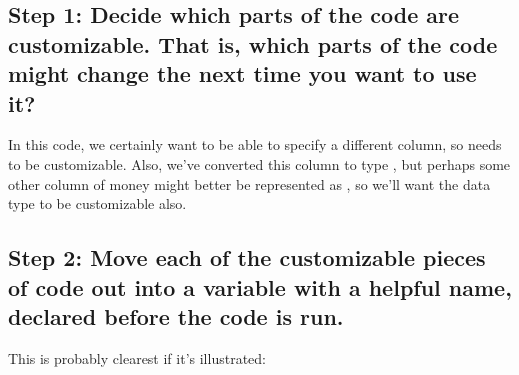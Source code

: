 \documentclass[letterpaper,10pt,english]{jupyterBook}
\begin{document}
\subsection{Step 1:  Decide which parts of the code are customizable.  That is, which parts of the code might change the next time you want to use it?}
\label{\detokenize{chapter-7-abstraction:step-1-decide-which-parts-of-the-code-are-customizable-that-is-which-parts-of-the-code-might-change-the-next-time-you-want-to-use-it}}
\sphinxAtStartPar
In this code, we certainly want to be able to specify a different column, so  needs to be customizable.  Also, we’ve converted this column to type , but perhaps some other column of money might better be represented as , so we’ll want the data type to be customizable also.


\subsection{Step 2:  Move each of the customizable pieces of code out into a variable with a helpful name, declared before the code is run.}
\label{\detokenize{chapter-7-abstraction:step-2-move-each-of-the-customizable-pieces-of-code-out-into-a-variable-with-a-helpful-name-declared-before-the-code-is-run}}
\sphinxAtStartPar
This is probably clearest if it’s illustrated:

\begin{sphinxVerbatim}[commandchars=\\\{\}]
  
  
\PYG{p}{[}\PYG{p}{]}  \PYG{p}{[}\PYG{p}{]}    
\PYG{p}{[}\PYG{p}{]}  \PYG{p}{[}\PYG{p}{]}    
\PYG{p}{[}\PYG{p}{]}  \PYG{p}{[}\PYG{p}{]}       
\end{sphinxVerbatim}
\end{document}
